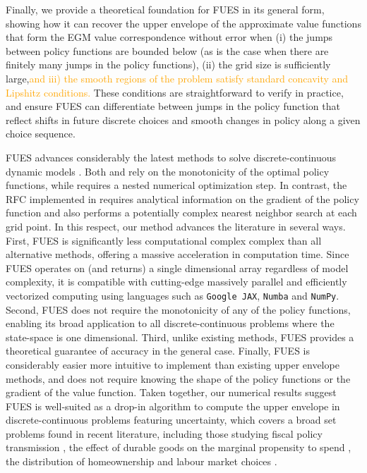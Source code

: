 \documentclass[12pt]{article}
\begin{document}
Finally, we provide a theoretical foundation for FUES in its general form, showing how it can recover the upper envelope of the approximate value functions that form the EGM value correspondence without error when (i) the jumps between policy functions are bounded below (as is the case when there are finitely many jumps in the policy functions), (ii) the grid size is sufficiently large,\textcolor{orange}{and iii) the smooth regions of the problem satisfy standard concavity and Lipshitz conditions.} These conditions are straightforward to verify in practice, and ensure FUES can differentiate between jumps in the policy function that reflect shifts in future discrete choices and smooth changes in policy along a given choice sequence.

FUES advances considerably the latest methods to solve discrete-continuous dynamic models \citep{Fella2014, Iskhakov2017, Druedahl2021, DS2024RFC}. Both \cite{Fella2014} and  \cite{Iskhakov2017} rely on the monotonicity of the optimal policy functions, while \cite{Druedahl2021} requires a nested numerical optimization step. In contrast, the RFC implemented in \cite{DS2024RFC} requires analytical information on the gradient of the policy function and also performs a potentially complex nearest neighbor search at each grid point. In this respect, our method advances the literature in several ways. First, FUES is significantly less computational complex complex \citep{Fella2014, Iskhakov2017, Druedahl2021, DS2024RFC} than all alternative methods, offering a massive acceleration in computation time. Since FUES operates on (and returns) a single dimensional array regardless of model complexity, it is compatible with cutting-edge massively parallel and efficiently vectorized computing using languages such as \texttt{Google JAX}, \texttt{Numba} and \texttt{NumPy}. Second, FUES does not require the monotonicity of any of the policy functions, enabling its broad application to all discrete-continuous problems where the state-space is one dimensional. Third, unlike existing methods, FUES provides a theoretical guarantee of accuracy in the general case. Finally, FUES is considerably easier more intuitive to implement than existing upper envelope methods, and does not require knowing the shape of the policy functions or the gradient of the value function. Taken together, our numerical results suggest FUES is well-suited as a drop-in algorithm to compute the upper envelope in discrete-continuous problems featuring uncertainty, which covers a broad set problems found in recent literature, including those studying fiscal policy transmission \citep{brumm2024global}, the effect of durable goods on the marginal propensity to spend \citep{Kovacs2021,NBERw32080}, the distribution of homeownership \citep{LeBlanc2023housing} and labour market choices \citep{CRUCES2024104960, Bacher2024}. 
\end{document}

